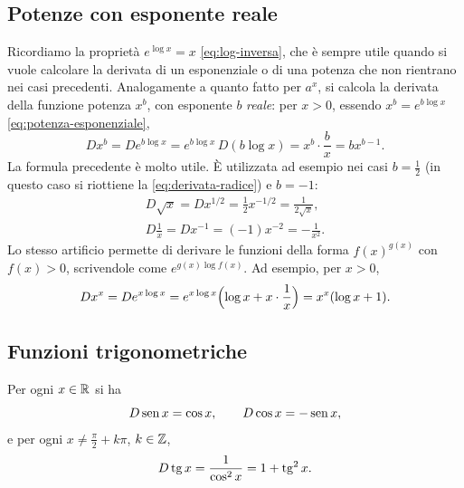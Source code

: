 \subsection{Potenze con esponente reale}

Ricordiamo la proprietà $e^{\log x}=x$ \eqref{eq:log-inversa}, che è sempre utile quando
si vuole calcolare la derivata di un esponenziale o di una potenza che non rientrano nei
casi precedenti. Analogamente a quanto fatto per $a^{x}$, si calcola la derivata della
funzione potenza $x^{b}$, con esponente $b$ \emph{reale}: per $x>0$, essendo
$x^{b}=e^{b\log x}$ \eqref{eq:potenza-esponenziale},
\begin{equation}\label{eq:derivata-xb}
  Dx^{b}=De^{b\log x}=e^{b\log x}\,D(b\log x)=x^{b}\cdot\frac bx=bx^{b-1}.
\end{equation}
La formula precedente è molto utile. È utilizzata ad esempio nei casi $b=\frac12$ (in
questo caso si riottiene la \eqref{eq:derivata-radice}) e $b=-1$:
\begin{equation}\label{eq:derivata-radice-reciproco}
\begin{gathered}
  D\sqrt x=Dx^{1/2}=\frac12x^{-1/2}=\frac1{2\sqrt x},\\
  D\frac1x=Dx^{-1}=(-1)x^{-2}=-\frac1{x^{2}} .
\end{gathered}
\end{equation}
Lo stesso artificio permette di derivare le funzioni della forma $f(x)^{g(x)}$ con
$f(x)>0$, scrivendole come $e^{g(x)\log f(x)}$. Ad esempio, per $x>0$,
\begin{equation}\label{eq:derivata-x-alla-x}
  Dx^{x}=De^{x\log x}=e^{x\log x}\Bigl(\log x+x\cdot\frac1x\Bigr)=x^{x}(\log x+1).
\end{equation}

\subsection{Funzioni trigonometriche}

\begin{proposizione}\label{prop:derivata-sen-cos}
Per ogni $x\in\mathbb{R}$ si ha
\begin{equation}\label{eq:derivata-sen-cos}
  D\operatorname{sen} x=\cos x, \qquad D\cos x=-\operatorname{sen} x,
\end{equation}
e per ogni $x\neq\frac\pi2+k\pi$, $k\in\mathbb{Z}$,
\begin{equation}\label{eq:derivata-tg}
  D\operatorname{tg} x=\frac1{\cos^{2}x}=1+\operatorname{tg}^{2}x .
\end{equation}
\end{proposizione}

